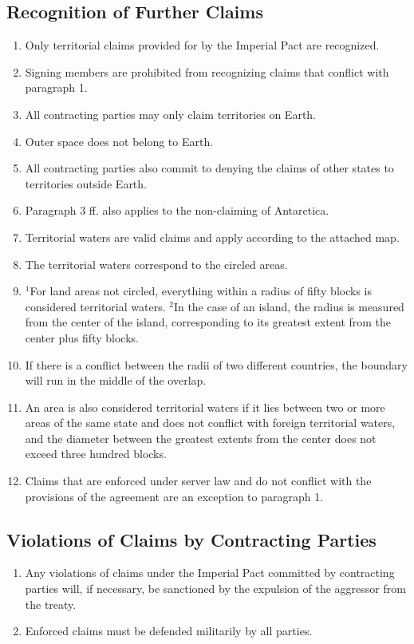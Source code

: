 \documentclass{article}
\begin{document}
\subsection{Recognition of Further Claims}
\begin{enumerate}[(1)]
    \item Only territorial claims provided for by the Imperial Pact are recognized.
    \item Signing members are prohibited from recognizing claims that conflict with paragraph 1.
    \item All contracting parties may only claim territories on Earth.
    \item Outer space does not belong to Earth.
    \item All contracting parties also commit to denying the claims of other states to territories outside Earth.
    \item Paragraph 3 ff. also applies to the non-claiming of Antarctica.
    \item Territorial waters are valid claims and apply according to the attached map.
    \item The territorial waters correspond to the circled areas.
    \item ${^1}$For land areas not circled, everything within a radius of fifty blocks is considered territorial waters. ${^2}$In the case of an island, the radius is measured from the center of the island, corresponding to its greatest extent from the center plus fifty blocks.
    \item If there is a conflict between the radii of two different countries, the boundary will run in the middle of the overlap.
    \item An area is also considered territorial waters if it lies between two or more areas of the same state and does not conflict with foreign territorial waters, and the diameter between the greatest extents from the center does not exceed three hundred blocks.
    \item Claims that are enforced under server law and do not conflict with the provisions of the agreement are an exception to paragraph 1.
\end{enumerate}

\subsection{Violations of Claims by Contracting Parties}
\begin{enumerate}[(1)]
    \item Any violations of claims under the Imperial Pact committed by contracting parties will, if necessary, be sanctioned by the expulsion of the aggressor from the treaty.
    \item Enforced claims must be defended militarily by all parties.
\end{enumerate}
\end{document}
